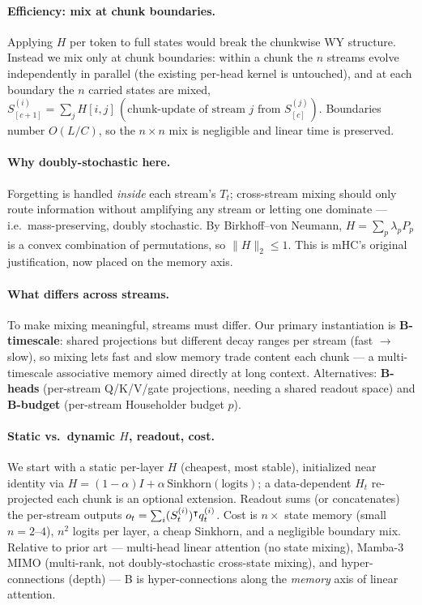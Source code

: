 \documentclass[11pt,letterpaper,logo]{yalearxiv}
\newcommand{\Tcarry}{T}          %
\begin{document}
\paragraph{Efficiency: mix at chunk boundaries.} Applying $H$ per token to full
states would break the chunkwise WY structure. Instead we mix only at chunk
boundaries: within a chunk the $n$ streams evolve independently in parallel (the
existing per-head kernel is untouched), and at each boundary the $n$ carried states
are mixed,
$S_{[c+1]}^{(i)} = \sum_j H[i,j]\,(\text{chunk-update of stream }j\text{ from }
S_{[c]}^{(j)})$. Boundaries number $O(L/C)$, so the $n\times n$ mix is negligible and
linear time is preserved.

\paragraph{Why doubly-stochastic here.} Forgetting is handled \emph{inside} each
stream's $\Tcarry_t$; cross-stream mixing should only route information without
amplifying any stream or letting one dominate --- i.e.\ mass-preserving, doubly
stochastic. By Birkhoff--von Neumann, $H = \sum_p \lambda_p P_p$ is a convex
combination of permutations, so $\|H\|_2 \le 1$. This is mHC's original justification,
now placed on the memory axis.

\paragraph{What differs across streams.} To make mixing meaningful, streams must
differ. Our primary instantiation is \textbf{B-timescale}: shared projections but
different decay ranges per stream (fast $\to$ slow), so mixing lets fast and slow
memory trade content each chunk --- a multi-timescale associative memory aimed
directly at long context. Alternatives: \textbf{B-heads} (per-stream Q/K/V/gate
projections, needing a shared readout space) and \textbf{B-budget} (per-stream
Householder budget $p$).

\paragraph{Static vs.\ dynamic $H$, readout, cost.} We start with a static per-layer
$H$ (cheapest, most stable), initialized near identity via
$H = (1-\alpha)I + \alpha\,\mathrm{Sinkhorn}(\text{logits})$; a data-dependent $H_t$
re-projected each chunk is an optional extension. Readout sums (or concatenates) the
per-stream outputs $o_t = \sum_i (S_t^{(i)})^{\intercal} q_t^{(i)}$. Cost is $n\times$ state
memory (small $n\!=\!2\text{--}4$), $n^2$ logits per layer, a cheap Sinkhorn, and a
negligible boundary mix. Relative to prior art --- multi-head linear attention (no
state mixing), Mamba-3 MIMO (multi-rank, not doubly-stochastic cross-state mixing),
and hyper-connections (depth) --- B is hyper-connections along the \emph{memory} axis
of linear attention.
\end{document}
